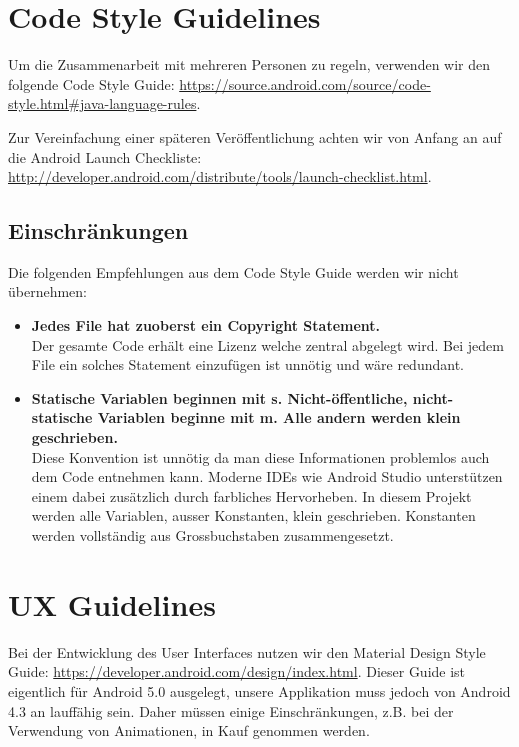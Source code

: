 \section{Code Style Guidelines}
\label{sec:Code Style Guidelines}

Um die Zusammenarbeit mit mehreren Personen zu regeln, verwenden wir den folgende Code Style Guide: \url{https://source.android.com/source/code-style.html#java-language-rules}.

Zur Vereinfachung einer späteren Veröffentlichung achten wir von Anfang an auf die Android Launch Checkliste:\\ \url{http://developer.android.com/distribute/tools/launch-checklist.html}.

\subsection{Einschränkungen}
Die folgenden Empfehlungen aus dem Code Style Guide werden wir nicht übernehmen:

\begin{itemize}
\item \textbf{Jedes File hat zuoberst ein Copyright Statement.} \\ Der gesamte Code erhält eine Lizenz welche zentral abgelegt wird. Bei jedem File ein solches Statement einzufügen ist unnötig und wäre redundant.
\item \textbf{Statische Variablen beginnen mit s. Nicht-öffentliche, nicht-statische Variablen beginne mit m. Alle andern werden klein geschrieben.} \\ Diese Konvention ist unnötig da man diese Informationen problemlos auch dem Code entnehmen kann. Moderne IDEs wie Android Studio unterstützen einem dabei zusätzlich durch farbliches Hervorheben. In diesem Projekt werden alle Variablen, ausser Konstanten, klein geschrieben. Konstanten werden vollständig aus Grossbuchstaben zusammengesetzt.
\end{itemize}

\section{UX Guidelines}
\label{sec:UX Guidelines}

Bei der Entwicklung des User Interfaces nutzen wir den Material Design Style Guide:
\url{https://developer.android.com/design/index.html}. Dieser Guide ist eigentlich für Android 5.0 ausgelegt, unsere Applikation muss jedoch von Android 4.3 an lauffähig sein. Daher müssen einige Einschränkungen, z.B. bei der Verwendung von Animationen, in Kauf genommen werden.
